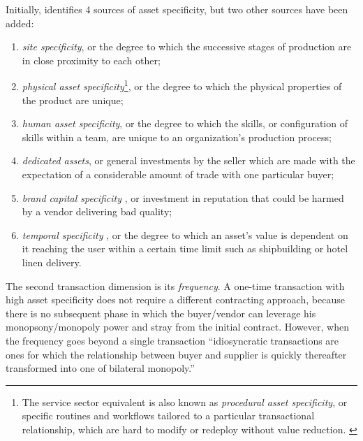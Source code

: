 \documentclass[12pt]{article}
\providecommand{\tightlist}{%
  \setlength{\itemsep}{0pt}\setlength{\parskip}{0pt}}
\begin{document}
Initially, \citet[95-96]{williamson1985} identifies 4 sources of asset
specificity, but two other sources have been added:

\begin{enumerate}
\def\labelenumi{\arabic{enumi}.}
\tightlist
\item
  \emph{site specificity}, or the degree to which the successive stages
  of production are in close proximity to each other;
\item
  \emph{physical asset specificity}\footnote{The service sector
    equivalent is also known as \emph{procedural asset specificity}, or
    specific routines and workflows tailored to a particular
    transactional relationship, which are hard to modify or redeploy
    without value reduction. \citep{zaheer1995}}, or the degree to which
  the physical properties of the product are unique;
\item
  \emph{human asset specificity}, or the degree to which the skills, or
  configuration of skills within a team, are unique to an organization's
  production process;
\item
  \emph{dedicated assets}, or general investments by the seller which
  are made with the expectation of a considerable amount of trade with
  one particular buyer;
\item
  \emph{brand capital specificity} \citep[ 335]{vita2011}, or investment
  in reputation that could be harmed by a vendor delivering bad quality;
\item
  \emph{temporal specificity} \citep[ 486]{malone1987}, or the degree to
  which an asset's value is dependent on it reaching the user within a
  certain time limit such as shipbuilding or hotel linen delivery.
\end{enumerate}

The second transaction dimension is its \emph{frequency}. A one-time
transaction with high asset specificity does not require a different
contracting approach, because there is no subsequent phase in which the
buyer/vendor can leverage his monopsony/monopoly power and stray from
the initial contract. However, when the frequency goes beyond a single
transaction ``idiosyncratic transactions are ones for which the
relationship between buyer and supplier is quickly thereafter
transformed into one of bilateral monopoly.'' \citep[
241]{williamson1985}
\end{document}
